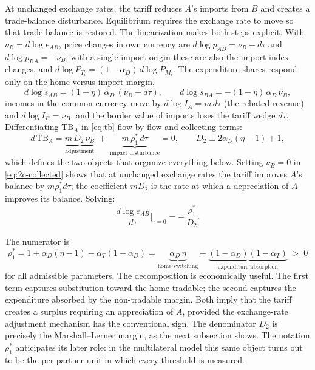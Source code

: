 \documentclass[11pt]{article}
\begin{document}
At unchanged exchange rates, the tariff reduces $A$'s imports from $B$ and creates a trade-balance disturbance. Equilibrium requires the exchange rate to move so that trade balance is restored. The linearization makes both steps explicit. With $\nu_B = d\log e_{AB}$, price changes in own currency are $d\log p_{AB} = \nu_B + d\tau$ and $d\log p_{BA} = -\nu_B$; with a single import origin these are also the import-index changes, and $d\log P_{T_i} = (1-\alpha_D)\, d\log P_{M_i}$. The expenditure shares respond only on the home-versus-import margin,
\begin{equation}
d\log s_{AB} = (1-\eta)\,\alpha_D\,(\nu_B + d\tau),
\qquad
d\log s_{BA} = -(1-\eta)\,\alpha_D\,\nu_B ,
\label{eq:2c-shares}
\end{equation}
incomes in the common currency move by $d\log I_A = m\, d\tau$ (the rebated revenue) and $d\log I_B = \nu_B$, and the border value of imports loses the tariff wedge $d\tau$. Differentiating $\mathrm{TB}_A$ in \eqref{eq:tb} flow by flow and collecting terms:
\begin{equation}
d\,\mathrm{TB}_A
= \underbrace{m\, D_2\, \nu_B}_{\text{adjustment}}
\;+\; \underbrace{m\, \rho_1^*\, d\tau}_{\text{impact disturbance}}
= 0,
\qquad
D_2 \equiv 2\alpha_D(\eta-1) + 1 ,
\label{eq:2c-collected}
\end{equation}
which defines the two objects that organize everything below. Setting $\nu_B = 0$ in \eqref{eq:2c-collected} shows that at unchanged exchange rates the tariff improves $A$'s balance by $m\rho_1^* d\tau$; the coefficient $mD_2$ is the rate at which a depreciation of $A$ improves its balance. Solving:
\begin{equation}
\boxed{\;
\frac{d\log e_{AB}}{d\tau}\bigg|_{\tau=0}
= -\,\frac{\rho_1^*}{D_2} .
\;}
\label{eq:2c-slope}
\end{equation}

The numerator is
\begin{equation}
\rho_1^*
= 1 + \alpha_D(\eta-1) - \alpha_T(1-\alpha_D)
= \underbrace{\alpha_D\,\eta}_{\text{home switching}} + \underbrace{(1-\alpha_D)(1-\alpha_T)}_{\text{expenditure absorption}}
\;>\; 0
\label{eq:rho1-identity}
\end{equation}
for all admissible parameters. The decomposition is economically useful. The first term captures substitution toward the home tradable; the second captures the expenditure absorbed by the non-tradable margin. Both imply that the tariff creates a surplus requiring an appreciation of $A$, provided the exchange-rate adjustment mechanism has the conventional sign. The denominator $D_2$ is precisely the Marshall--Lerner margin, as the next subsection shows. The notation $\rho_1^*$ anticipates its later role: in the multilateral model this same object turns out to be the per-partner unit in which every threshold is measured.
\end{document}

